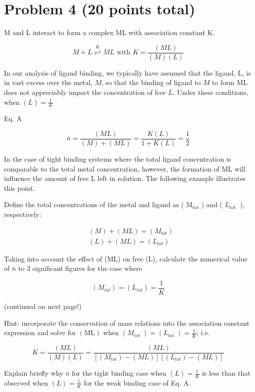 \documentclass[12pt]{article}
\begin{document}
\section{Problem 4 (20 points total)}
$\mathrm{M}$ and $\mathrm{L}$ interact to form a complex $\mathrm{ML}$ with association constant $\mathrm{K}$.

$$
M+L \stackrel{K}{\rightleftharpoons} M L \text { with } K=\frac{(M L)}{(M)(L)}
$$

In our analysis of ligand binding, we typically have assumed that the ligand, L, is in vast excess over the metal, $M$, so that the binding of ligand to $M$ to form ML does not appreciably impact the concentration of free $L$. Under these conditions, when $(L)=\frac{1}{K}$

Eq. A

$$
\bar{n}=\frac{(M L)}{(M)+(M L)}=\frac{K(L)}{1+K(L)}=\frac{1}{2}
$$

In the case of tight binding systems where the total ligand concentration is comparable to the total metal concentration, however, the formation of ML will influence the amount of free L left in solution. The following example illustrates this point.

Define the total concentrations of the metal and ligand as ( $\mathrm{M}_{\mathrm{tot}}$ ) and ( $L_{\text {tot }}$ ), respectively:

$$
\begin{aligned}
& (M)+(M L)=\left(M_{t o t}\right) \\
& (L)+(M L)=\left(L_{t o t}\right)
\end{aligned}
$$

Taking into account the effect of (ML) on free (L), calculate the numerical value of $\bar{n}$ to 3 significant figures for the case where

$$
\left(M_{t o t}\right)=\left(L_{t o t}\right)=\frac{1}{K}
$$

(continued on next page!)

Hint: incorporate the conservation of mass relations into the association constant expression and solve for $(\mathrm{ML})$ when $\left(M_{\text {tot }}\right)=\left(L_{\text {tot }}\right)=\frac{1}{K}$; i.e.

$$
K=\frac{(M L)}{(M)(L)}=\frac{(M L)}{\left[\left(M_{t o t}\right)-(M L)\right]\left[\left(L_{t o t}\right)-(M L)\right]}
$$

Explain briefly why $\bar{n}$ for the tight binding case when $(L)=\frac{1}{K}$ is less than that observed when $(L)=\frac{1}{K}$ for the weak binding case of Eq. A.
\end{document}
